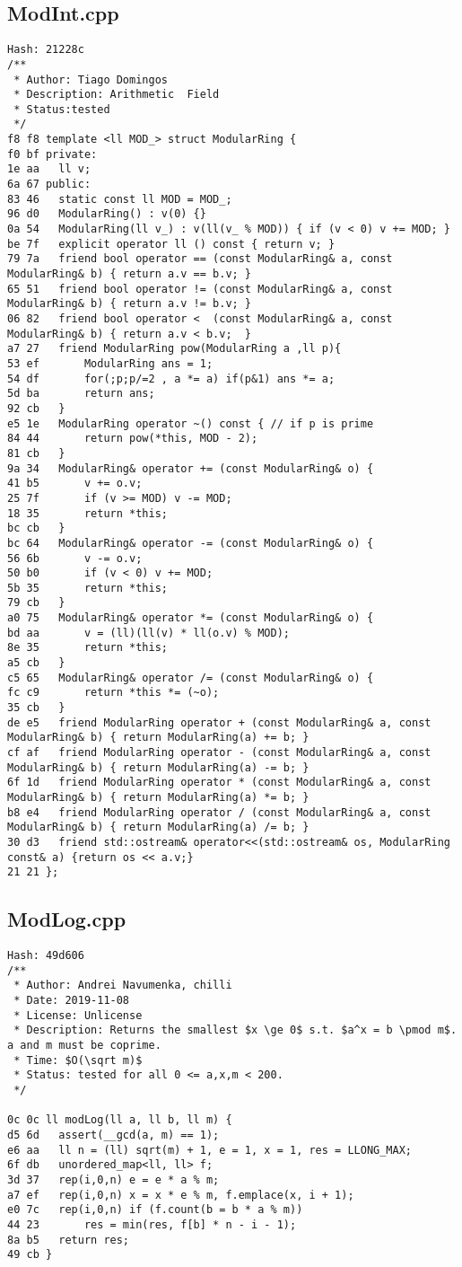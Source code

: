 \documentclass[11pt, a4paper, twoside]{article}
\begin{document}
\subsection{ModInt.cpp}
\begin{lstlisting}
Hash: 21228c
/**
 * Author: Tiago Domingos
 * Description: Arithmetic  Field
 * Status:tested
 */
f8 f8 template <ll MOD_> struct ModularRing {
f0 bf private:
1e aa 	ll v;
6a 67 public:
83 46 	static const ll MOD = MOD_;
96 d0 	ModularRing() : v(0) {}
0a 54 	ModularRing(ll v_) : v(ll(v_ % MOD)) { if (v < 0) v += MOD; }
be 7f 	explicit operator ll () const { return v; }
79 7a 	friend bool operator == (const ModularRing& a, const ModularRing& b) { return a.v == b.v; }
65 51 	friend bool operator != (const ModularRing& a, const ModularRing& b) { return a.v != b.v; }
06 82 	friend bool operator <  (const ModularRing& a, const ModularRing& b) { return a.v < b.v;  }
a7 27 	friend ModularRing pow(ModularRing a ,ll p){
53 ef 		ModularRing ans = 1;
54 df 		for(;p;p/=2 , a *= a) if(p&1) ans *= a;
5d ba 		return ans;
92 cb 	}
e5 1e 	ModularRing operator ~() const { // if p is prime
84 44 		return pow(*this, MOD - 2);
81 cb 	}
9a 34 	ModularRing& operator += (const ModularRing& o) {
41 b5 		v += o.v;
25 7f 		if (v >= MOD) v -= MOD;
18 35 		return *this;
bc cb 	}
bc 64 	ModularRing& operator -= (const ModularRing& o) {
56 6b 		v -= o.v;
50 b0 		if (v < 0) v += MOD;
5b 35 		return *this;
79 cb 	}
a0 75 	ModularRing& operator *= (const ModularRing& o) {
bd aa 		v = (ll)(ll(v) * ll(o.v) % MOD);
8e 35 		return *this;
a5 cb 	}
c5 65 	ModularRing& operator /= (const ModularRing& o) {
fc c9 		return *this *= (~o);
35 cb 	}
de e5 	friend ModularRing operator + (const ModularRing& a, const ModularRing& b) { return ModularRing(a) += b; }
cf af 	friend ModularRing operator - (const ModularRing& a, const ModularRing& b) { return ModularRing(a) -= b; }
6f 1d 	friend ModularRing operator * (const ModularRing& a, const ModularRing& b) { return ModularRing(a) *= b; }
b8 e4 	friend ModularRing operator / (const ModularRing& a, const ModularRing& b) { return ModularRing(a) /= b; }
30 d3  	friend std::ostream& operator<<(std::ostream& os, ModularRing const& a) {return os << a.v;}
21 21 };
\end{lstlisting}

\subsection{ModLog.cpp}
\begin{lstlisting}
Hash: 49d606
/**
 * Author: Andrei Navumenka, chilli
 * Date: 2019-11-08
 * License: Unlicense
 * Description: Returns the smallest $x \ge 0$ s.t. $a^x = b \pmod m$. a and m must be coprime.
 * Time: $O(\sqrt m)$
 * Status: tested for all 0 <= a,x,m < 200.
 */

0c 0c ll modLog(ll a, ll b, ll m) {
d5 6d 	assert(__gcd(a, m) == 1);
e6 aa 	ll n = (ll) sqrt(m) + 1, e = 1, x = 1, res = LLONG_MAX;
6f db 	unordered_map<ll, ll> f;
3d 37 	rep(i,0,n) e = e * a % m;
a7 ef 	rep(i,0,n) x = x * e % m, f.emplace(x, i + 1);
e0 7c 	rep(i,0,n) if (f.count(b = b * a % m))
44 23 		res = min(res, f[b] * n - i - 1);
8a b5 	return res;
49 cb }
\end{lstlisting}
\end{document}
